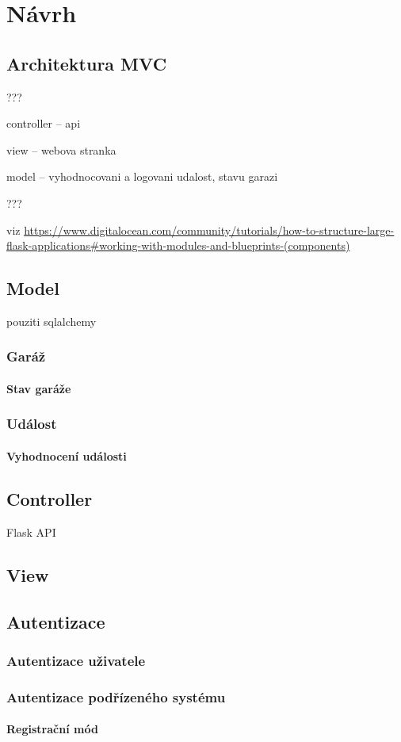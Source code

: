 \chapter{Návrh}
\label{sec:de}

\section{Architektura MVC}

???

controller -- api

view -- webova stranka

model -- vyhodnocovani a logovani udalost, stavu garazi

???

viz \url{https://www.digitalocean.com/community/tutorials/how-to-structure-large-flask-applications#working-with-modules-and-blueprints-(components)}

\section{Model}

pouziti sqlalchemy

\subsection{Garáž}

\subsubsection{Stav garáže}

\subsection{Událost}

\subsubsection{Vyhodnocení události}

\section{Controller}

Flask API

\section{View}

\section{Autentizace}

\subsection{Autentizace uživatele}

\subsection{Autentizace podřízeného systému}

\subsubsection{Registrační mód}

